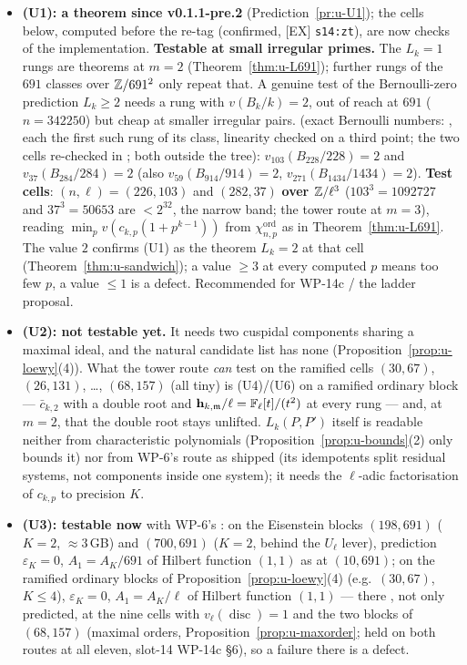 \documentclass[11pt]{article}
\newcommand{\hcusp}{\mathbf{h}}                   %
\begin{document}
\begin{itemize}
\item \textbf{(U1): a theorem since v0.1.1-pre.2} (Prediction~\ref{pr:u-U1}); the cells below, computed before the re-tag (confirmed, [EX]
  \texttt{s14:zt}), are now checks of the implementation. \textbf{Testable at small irregular primes.} The $L_k=1$ rungs are theorems at $m=2$ (Theorem~\ref{thm:u-L691}); further rungs of the
  $691$ classes over $\mathbb{Z}/691^{2}$ only repeat that. A genuine test of the Bernoulli-zero prediction $L_k\ge2$ needs a rung with $v(B_k/k)=2$, out of reach at
  $691$ ($n=342250$) but cheap at smaller irregular pairs. \COMP{} (exact Bernoulli numbers: ,
  each the first such rung of its class, linearity checked on a third point; the two cells re-checked in
  ; both outside the tree):
  $v_{103}(B_{228}/228)=2$ and $v_{37}(B_{284}/284)=2$ (also $v_{59}(B_{914}/914)=2$, $v_{271}(B_{1434}/1434)=2$). \textbf{Test cells}: $(n,\ell)=(226,103)$ and
  $(282,37)$ \textbf{over $\mathbb{Z}/\ell^{3}$} ($103^{3}=1092727$ and $37^{3}=50653$ are $<2^{32}$, the narrow band; the tower route at $m=3$), reading
  $\min_pv(c_{k,p}(1+p^{k-1}))$ from $\chi^{\mathrm{ord}}_{n,p}$ as in Theorem~\ref{thm:u-L691}. The value $2$ confirms (U1) as the theorem $L_k=2$ at that cell
  (Theorem~\ref{thm:u-sandwich}); a value $\ge3$ at every computed $p$ means too few $p$, a value $\le1$ is a defect. Recommended for WP-14c / the ladder proposal.
\item \textbf{(U2): not testable yet.} It needs two cuspidal components sharing a maximal ideal, and the natural candidate list has none
  (Proposition~\ref{prop:u-loewy}(4)). What the tower route \emph{can} test on the ramified cells $(30,67)$, $(26,131)$, \dots, $(68,157)$ (all tiny) is (U4)/(U6) on
  a ramified ordinary block --- $\bar c_{k,2}$ with a double root and $\hcusp_{k,\mathfrak m}/\ell=\Fl[t]/(t^{2})$ at every rung --- and, at $m=2$, that the double
  root stays unlifted. $L_k(P,P')$ itself is readable neither from characteristic polynomials (Proposition~\ref{prop:u-bounds}(2) only bounds it) nor from WP-6's route
  as shipped (its idempotents split residual systems, not components inside one system); it needs the $\ell$-adic factorisation of $c_{k,p}$ to precision $K$.
\item \textbf{(U3): testable now} with WP-6's : on the Eisenstein blocks $(198,691)$ ($K=2$, $\approx3$\,GB) and $(700,691)$ ($K=2$,
  behind the $U_\ell$ lever), prediction $\varepsilon_K=0$, $A_1=A_K/691$ of Hilbert function $(1,1)$ as at $(10,691)$; on the ramified ordinary blocks of
  Proposition~\ref{prop:u-loewy}(4) (e.g.\ $(30,67)$, $K\le4$), $\varepsilon_K=0$, $A_1=A_K/\ell$ of Hilbert function $(1,1)$ --- there \PROVED, not only
  predicted, at the nine cells with $v_\ell(\operatorname{disc})=1$ and the two blocks of $(68,157)$ (maximal orders,
  Proposition~\ref{prop:u-maxorder}; held on both routes at all eleven, slot-14 WP-14c \S6), so a failure there is a defect.
\end{itemize}
\end{document}
